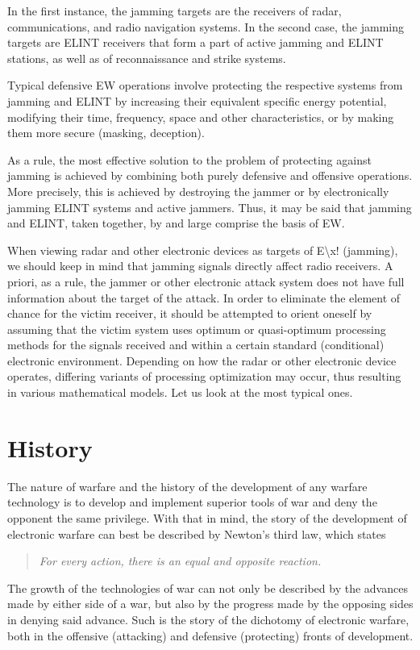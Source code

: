 \documentclass[palatino,english,purist]{ist-report}
\begin{document}
In the first instance, the jamming targets are the receivers of radar,
communications, and radio navigation systems. In the second case, the
jamming targets are ELINT receivers that form a part of active jamming and ELINT stations, as well as of reconnaissance and strike systems.

Typical defensive EW operations involve protecting the respective
systems from jamming and ELINT by increasing their equivalent specific
energy potential, modifying their time, frequency, space and other characteristics, or by making them more secure (masking, deception).

As a rule, the most effective solution to the problem of protecting
against jamming is achieved by combining both purely defensive and
offensive operations. More precisely, this is achieved by destroying the jammer or by electronically jamming ELINT systems and active jammers. Thus, it may be said that jamming and ELINT, taken together, by and large comprise the basis of EW. 

When viewing radar and other electronic devices as targets of E\textbackslash x!
(jamming), we should keep in mind that jamming signals directly affect radio receivers. A priori, as a rule, the jammer or other electronic attack system does not have full information about the target of the attack. In order to eliminate the element of chance for the victim receiver, it should be attempted to orient oneself by assuming that the victim system uses optimum or quasi-optimum processing methods for the signals received and within a certain standard (conditional) electronic environment. Depending on how the radar or other electronic device operates, differing variants of processing optimization may occur, thus resulting in various mathematical models. Let us look at the most typical ones. 
\part{History}

The nature of warfare and the history of the development of any warfare technology is to develop and implement superior tools of war and deny the opponent the same privilege. With that in mind, the story of the development of electronic warfare can best be described by Newton's third law, which states
\begin{quote}\itshape
    For every action, there is an equal and opposite reaction.
\end{quote}
The growth of the technologies of war can not only be described by the advances made by either side of a war, but also by the progress made by the opposing sides in denying said advance. Such is the story of the dichotomy of electronic warfare, both in the offensive (attacking) and defensive (protecting) fronts of development.
\end{document}
